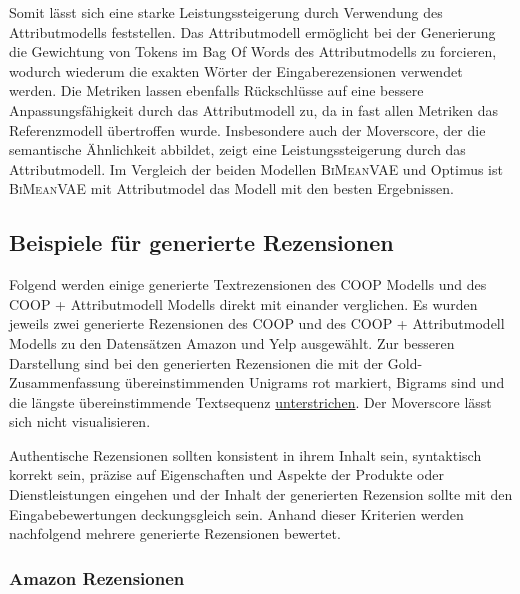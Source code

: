 Somit lässt sich eine starke Leistungssteigerung durch Verwendung des Attributmodells feststellen. 
Das Attributmodell ermöglicht bei der Generierung die Gewichtung von Tokens im Bag Of Words des Attributmodells zu forcieren, wodurch wiederum die exakten Wörter der Eingaberezensionen verwendet werden.
Die Metriken lassen ebenfalls Rückschlüsse auf eine bessere Anpassungsfähigkeit durch das Attributmodell zu, da in fast allen Metriken das Referenzmodell übertroffen wurde.
Insbesondere auch der Moverscore, der die semantische Ähnlichkeit abbildet, zeigt eine Leistungssteigerung durch das Attributmodell.
Im Vergleich der beiden Modellen \textsc{BiMeanVAE} und Optimus ist \textsc{BiMeanVAE} mit Attributmodel das Modell mit den besten Ergebnissen.

\pagebreak
\subsection{Beispiele für generierte Rezensionen}
\label{example}



Folgend werden einige generierte Textrezensionen des COOP Modells und des COOP + Attributmodell Modells direkt mit einander verglichen.
Es wurden jeweils zwei generierte Rezensionen des COOP und des COOP + Attributmodell Modells zu den Datensätzen Amazon und Yelp ausgewählt. 
Zur besseren Darstellung sind bei den generierten Rezensionen die mit der Gold-Zusammenfassung übereinstimmenden Unigrams \textcolor{HighlightColor}{rot} markiert, Bigrams sind  und die längste übereinstimmende Textsequenz \underline{unterstrichen}.
Der Moverscore lässt sich nicht visualisieren.

Authentische Rezensionen sollten konsistent in ihrem Inhalt sein, syntaktisch korrekt sein, präzise auf Eigenschaften und Aspekte der Produkte oder Dienstleistungen eingehen und der Inhalt der generierten Rezension sollte mit den Eingabebewertungen deck\-ungs\-gleich sein.
Anhand dieser Kriterien werden nachfolgend mehrere generierte Rezensionen bewertet.


\setlength{\fboxsep}{0.7em}

\subsubsection{Amazon Rezensionen}

